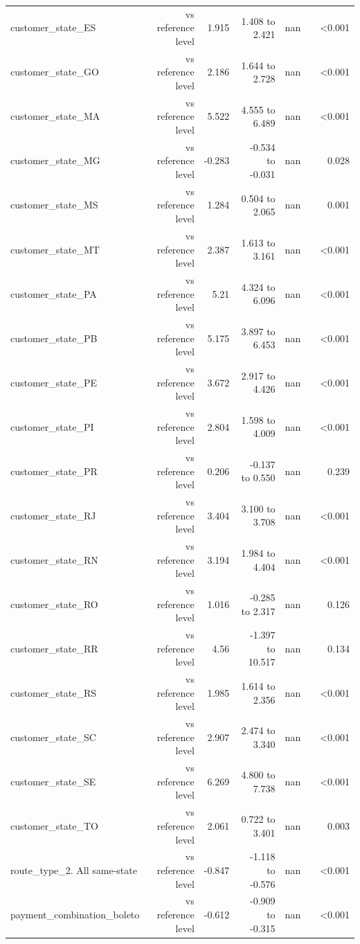 \begin{table}[htbp]
\begin{tabular}{lrrrrrr}
customer\_state\_ES & vs reference level & 1.915 & 1.408 to 2.421 & nan &  & <0.001 \\
customer\_state\_GO & vs reference level & 2.186 & 1.644 to 2.728 & nan &  & <0.001 \\
customer\_state\_MA & vs reference level & 5.522 & 4.555 to 6.489 & nan &  & <0.001 \\
customer\_state\_MG & vs reference level & -0.283 & -0.534 to -0.031 & nan &  & 0.028 \\
customer\_state\_MS & vs reference level & 1.284 & 0.504 to 2.065 & nan &  & 0.001 \\
customer\_state\_MT & vs reference level & 2.387 & 1.613 to 3.161 & nan &  & <0.001 \\
customer\_state\_PA & vs reference level & 5.21 & 4.324 to 6.096 & nan &  & <0.001 \\
customer\_state\_PB & vs reference level & 5.175 & 3.897 to 6.453 & nan &  & <0.001 \\
customer\_state\_PE & vs reference level & 3.672 & 2.917 to 4.426 & nan &  & <0.001 \\
customer\_state\_PI & vs reference level & 2.804 & 1.598 to 4.009 & nan &  & <0.001 \\
customer\_state\_PR & vs reference level & 0.206 & -0.137 to 0.550 & nan &  & 0.239 \\
customer\_state\_RJ & vs reference level & 3.404 & 3.100 to 3.708 & nan &  & <0.001 \\
customer\_state\_RN & vs reference level & 3.194 & 1.984 to 4.404 & nan &  & <0.001 \\
customer\_state\_RO & vs reference level & 1.016 & -0.285 to 2.317 & nan &  & 0.126 \\
customer\_state\_RR & vs reference level & 4.56 & -1.397 to 10.517 & nan &  & 0.134 \\
customer\_state\_RS & vs reference level & 1.985 & 1.614 to 2.356 & nan &  & <0.001 \\
customer\_state\_SC & vs reference level & 2.907 & 2.474 to 3.340 & nan &  & <0.001 \\
customer\_state\_SE & vs reference level & 6.269 & 4.800 to 7.738 & nan &  & <0.001 \\
customer\_state\_TO & vs reference level & 2.061 & 0.722 to 3.401 & nan &  & 0.003 \\
route\_type\_2. All same-state & vs reference level & -0.847 & -1.118 to -0.576 & nan &  & <0.001 \\
payment\_combination\_boleto & vs reference level & -0.612 & -0.909 to -0.315 & nan &  & <0.001 \\

\end{tabular}
\end{table}
